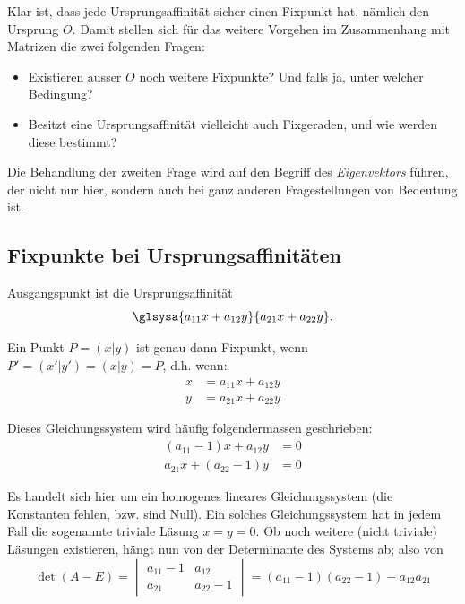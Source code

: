 \documentclass[%
11pt,%
twoside,%
titlepage,%
german,%
headsepline%
]{scrartcl}
\begin{document}
Klar ist, dass jede Ursprungsaffinität sicher einen Fixpunkt hat, nämlich den Ursprung $O$. Damit stellen sich für das weitere Vorgehen im Zusammenhang mit Matrizen die zwei folgenden Fragen:

\begin{itemize}
\item Existieren ausser $O$ noch weitere Fixpunkte? Und falls ja, unter welcher Bedingung?
\item Besitzt eine Ursprungsaffinität vielleicht auch Fixgeraden, und wie werden diese bestimmt?
\end{itemize}

Die Behandlung der zweiten Frage wird auf den Begriff des \emph{Eigenvektors} führen, der nicht nur hier, sondern auch bei ganz anderen Fragestellungen von Bedeutung ist.

\subsection{Fixpunkte bei Ursprungsaffinitäten}

Ausgangspunkt ist die Ursprungsaffinität
$$\glsysa{a_{11}x+a_{12}y}{a_{21}x+a_{22}y}.$$

Ein Punkt $P =(x|y)$ ist genau dann Fixpunkt, wenn $P' =(x'|y') =(x|y)=P$, d.h. wenn:
\begin{align*}
x &= a_{11}x+a_{12}y\\
y &= a_{21}x+a_{22}y
\end{align*}

Dieses Gleichungssystem wird häufig folgendermassen geschrieben:
\begin{align*}
(a_{11}-1)x+a_{12}y & = 0\\
a_{21}x+(a_{22}-1)y & = 0
\end{align*}

Es handelt sich hier um ein homogenes lineares Gleichungssystem (die Konstanten fehlen, bzw. sind Null). Ein solches Gleichungssystem hat in jedem Fall die sogenannte triviale Läsung $x = y = 0$. Ob noch weitere (nicht triviale) Läsungen existieren, hängt nun von der Determinante des Systems ab; also von
$$
\det(A-E)=
\begin{vmatrix}
a_{11}-1 & a_{12}\\
a_{21} & a_{22}-1
\end{vmatrix}
= (a_{11}-1)(a_{22}-1)-a_{12}a_{21}
$$
\end{document}

